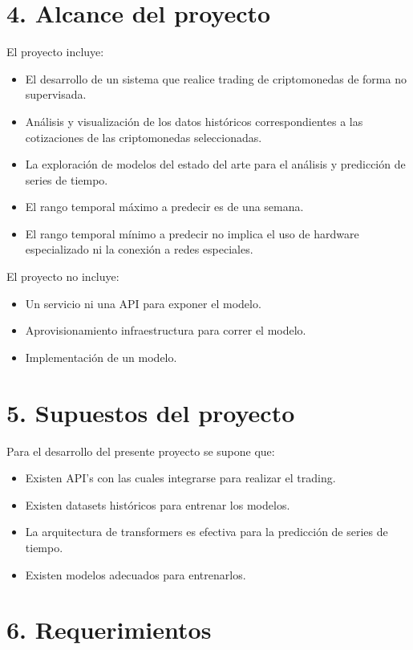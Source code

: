 \documentclass[
    11pt, %
]{charter}
\begin{document}
    \section{4. Alcance del proyecto}
    \label{sec:alcance}
    El proyecto incluye:
    \begin{itemize}
        \item El desarrollo de un sistema que realice trading de criptomonedas de forma no supervisada.
        \item Análisis y visualización de los datos históricos correspondientes a las cotizaciones de las criptomonedas seleccionadas.
        \item La exploración de modelos del estado del arte para el análisis y predicción de series de tiempo.
        \item El rango temporal máximo a predecir es de una semana.
        \item El rango temporal mínimo a predecir no implica el uso de hardware especializado ni la conexión a redes especiales.
    \end{itemize}
    El proyecto no incluye:
    \begin{itemize}
        \item Un servicio ni una API para exponer el modelo.
        \item Aprovisionamiento infraestructura para correr el modelo.
        \item Implementación de un modelo.
    \end{itemize}


    \section{5. Supuestos del proyecto}
    \label{sec:supuestos}
    Para el desarrollo del presente proyecto se supone que:

    \begin{itemize}
        \item Existen API's con las cuales integrarse para realizar el trading.
        \item Existen datasets históricos para entrenar los modelos.
        \item La arquitectura de transformers es efectiva para la predicción de series de tiempo.
        \item Existen modelos adecuados para entrenarlos.
    \end{itemize}

    \section{6. Requerimientos}
    \label{sec:requerimientos}
\end{document}
